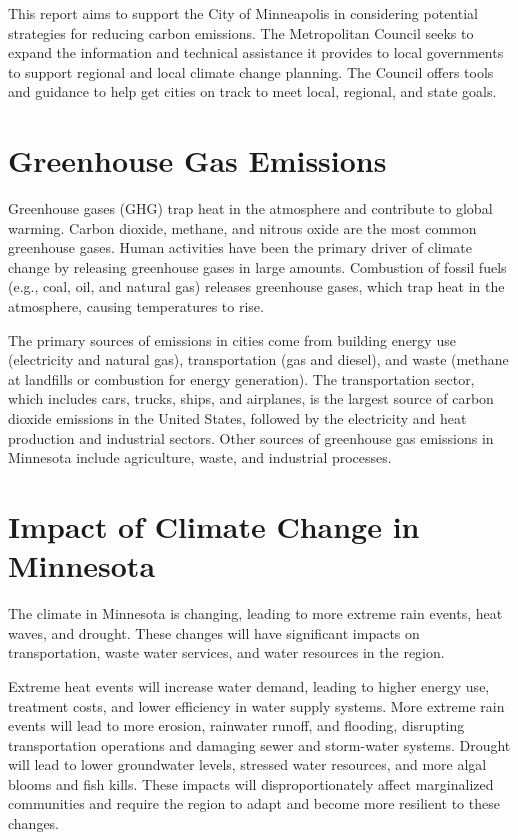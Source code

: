 \documentclass[
]{book}
\begin{document}
This report aims to support the City of Minneapolis in considering potential strategies for reducing carbon emissions. The Metropolitan Council seeks to expand the information and technical assistance it provides to local governments to support regional and local climate change planning. The Council offers tools and guidance to help get cities on track to meet local, regional, and state goals.

\hypertarget{greenhouse-gas-emissions}{%
\section{Greenhouse Gas Emissions}\label{greenhouse-gas-emissions}}

Greenhouse gases (GHG) trap heat in the atmosphere and contribute to global warming. Carbon dioxide, methane, and nitrous oxide are the most common greenhouse gases. Human activities have been the primary driver of climate change by releasing greenhouse gases in large amounts. Combustion of fossil fuels (e.g., coal, oil, and natural gas) releases greenhouse gases, which trap heat in the atmosphere, causing temperatures to rise.

The primary sources of emissions in cities come from building energy use (electricity and natural gas), transportation (gas and diesel), and waste (methane at landfills or combustion for energy generation). The transportation sector, which includes cars, trucks, ships, and airplanes, is the largest source of carbon dioxide emissions in the United States, followed by the electricity and heat production and industrial sectors. Other sources of greenhouse gas emissions in Minnesota include agriculture, waste, and industrial processes.

\hypertarget{impact-of-climate-change-in-minnesota}{%
\section{Impact of Climate Change in Minnesota}\label{impact-of-climate-change-in-minnesota}}

The climate in Minnesota is changing, leading to more extreme rain events, heat waves, and drought. These changes will have significant impacts on transportation, waste water services, and water resources in the region.

Extreme heat events will increase water demand, leading to higher energy use, treatment costs, and lower efficiency in water supply systems. More extreme rain events will lead to more erosion, rainwater runoff, and flooding, disrupting transportation operations and damaging sewer and storm-water systems. Drought will lead to lower groundwater levels, stressed water resources, and more algal blooms and fish kills. These impacts will disproportionately affect marginalized communities and require the region to adapt and become more resilient to these changes.
\end{document}
